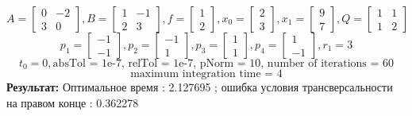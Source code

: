 \documentclass[10pt]{article}
\begin{document}
\newpage
{}
 \[ A = \begin{bmatrix}
      		0 & -2 \\[0.3em]
      		3 & 0
      	  \end{bmatrix} , 
 B = \begin{bmatrix}
      	   1 & -1 \\[0.3em]
      	   2 & 3
      \end{bmatrix} ,
 f = \begin{bmatrix}
       	    1 \\[0.3em]
      	    2
      \end{bmatrix} ,
 x_0 = \begin{bmatrix}
      	    2 \\[0.3em]
      	    3
      \end{bmatrix} ,
 x_1 = \begin{bmatrix}
      	9 \\[0.3em]
      	7
      \end{bmatrix} ,
 Q = \begin{bmatrix}
      	   1 & 1 \\[0.3em]
      	   1 & 2
      \end{bmatrix} \]
\[ p_1 = \begin{bmatrix}
      	-1 \\[0.3em]
      	-1
      \end{bmatrix} ,
p_2 = \begin{bmatrix}
      	-1 \\[0.3em]
      	1
      \end{bmatrix} ,
p_3 = \begin{bmatrix}
      	1 \\[0.3em]
      	1
      \end{bmatrix} ,
p_4 = \begin{bmatrix}
      	1 \\[0.3em]
      	-1
      \end{bmatrix}, r_1 = 3 \]
\[ t_0 = 0, \text{absTol = 1e-7, relTol = 1e-7, pNorm = 10, number of iterations = 60}\]  
\[\text{maximum integration time = 4} \]
\textbf{Результат:} Оптимальное время : 2.127695 ; ошибка условия трансверсальности на правом конце : 0.362278 
\end{document}
